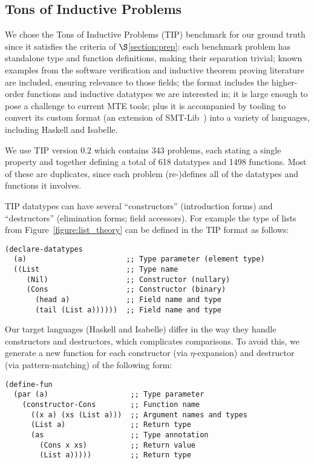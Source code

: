 \subsection{Tons of Inductive Problems}
\label{sec:tip}

We chose the Tons of Inductive Problems (TIP) benchmark for our ground truth
since it satisfies the criteria of $\S$\ref{section:prep}: each benchmark
problem has standalone type and function definitions, making their separation
trivial; known examples from the software verification and inductive theorem
proving literature are included, ensuring relevance to those fields; the format
includes the higher-order functions and inductive datatypes we are interested
in; it is large enough to pose a challenge to current MTE tools; plus it is
accompanied by tooling to convert its custom format (an extension of
SMT-Lib~\cite{BarFT-SMTLIB}) into a variety of languages, including Haskell and
Isabelle.

We use TIP version 0.2 which contains 343 problems, each stating a single
property and together defining a total of 618 datatypes and 1498 functions. Most
of these are duplicates, since each problem (re\nobreakdash-)defines all of the
datatypes and functions it involves.

TIP datatypes can have several ``constructors'' (introduction forms) and
``destructors'' (elimination forms; field accessors). For example the type of
lists from Figure~\ref{figure:list_theory} can be defined in the TIP format as
follows:

\begin{samepage}
\begin{verbatim}
(declare-datatypes
  (a)                       ;; Type parameter (element type)
  ((List                    ;; Type name
     (Nil)                  ;; Constructor (nullary)
     (Cons                  ;; Constructor (binary)
       (head a)             ;; Field name and type
       (tail (List a))))))  ;; Field name and type
\end{verbatim}
\end{samepage}

Our target languages (Haskell and Isabelle) differ in the way they handle
constructors and destructors, which complicates comparisons. To avoid this, we
generate a new function for each constructor (via $\eta$-expansion) and
destructor (via pattern-matching) of the following form:

\begin{samepage}
\begin{verbatim}
(define-fun
  (par (a)                   ;; Type parameter
    (constructor-Cons        ;; Function name
      ((x a) (xs (List a)))  ;; Argument names and types
      (List a)               ;; Return type
      (as                    ;; Type annotation
        (Cons x xs)          ;; Return value
        (List a)))))         ;; Return type
\end{verbatim}
\end{samepage}

